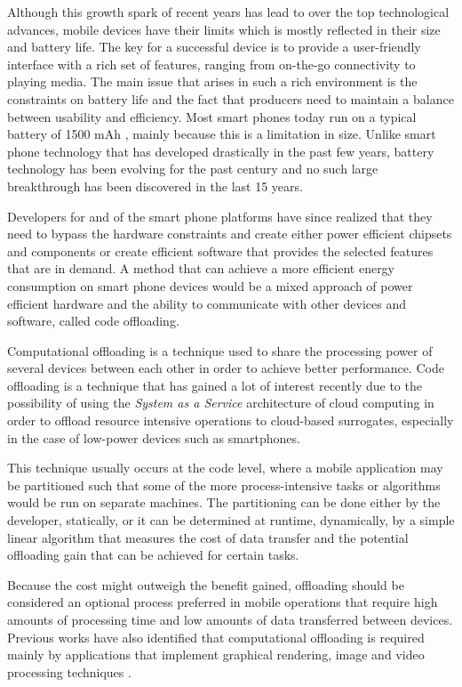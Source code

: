 Although this growth spark of recent years has lead to over the top technological advances, mobile devices have their limits which is mostly reflected in their size and battery life. The key for a successful device is to provide a user-friendly interface with a rich set of features, ranging from on-the-go connectivity to playing media. The main issue that arises in such a rich environment is the constraints on battery life and the fact that producers need to maintain a balance between usability and efficiency. Most smart phones today run on a typical battery of 1500 mAh \cite{ferreira2011understanding}, mainly because this is a limitation in size. Unlike smart phone technology that has developed drastically in the past few years, battery technology has been evolving for the past century and no such large breakthrough has been discovered in the last 15 years\cite{batteryLife}.


Developers for and of the smart phone platforms have since realized that they need to bypass the hardware constraints and create either power efficient chipsets and components or create efficient software that provides the selected features that are in demand. A method that can achieve a more efficient energy consumption on smart phone devices would be a mixed approach of power efficient hardware and the ability to communicate with other devices and software, called code offloading.


Computational offloading is a technique used to share the processing power of several devices between each other in order to achieve better performance. Code offloading is a technique that has gained a lot of interest recently due to the possibility of using the \textit{System as a Service} architecture of cloud computing in order to offload resource intensive operations to cloud-based surrogates\cite{shiraz2013review}, especially in the case of low-power devices such as smartphones. 

This technique usually occurs at the code level, where a mobile application may be partitioned such that some of the more process-intensive tasks or algorithms would be run on separate machines. The partitioning can be done either by the developer, statically, or it can be determined at runtime, dynamically, by a simple linear algorithm that measures the cost of data transfer and the potential offloading gain that can be achieved for certain tasks. 

Because the cost might outweigh the benefit gained, offloading should be considered an optional process preferred in mobile operations that require high amounts of processing time and low amounts of data transferred between devices\cite{kumar2010cloud}. Previous works have also identified that computational offloading is required mainly by applications that implement graphical rendering, image and video processing techniques\cite{cuervo2010maui} \cite{chun2011clonecloud}.

